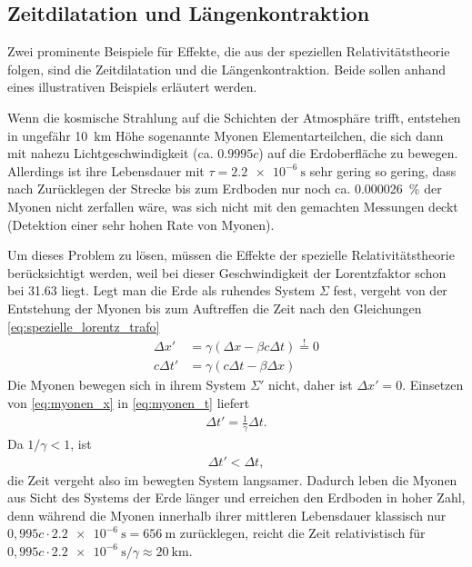 \subsection{Zeitdilatation und Längenkontraktion}

Zwei prominente Beispiele für Effekte, die aus der speziellen Relativitätstheorie folgen, sind die Zeitdilatation und die Längenkontraktion.
Beide sollen anhand eines illustrativen Beispiels erläutert werden.

Wenn die kosmische Strahlung auf die Schichten der Atmosphäre trifft, entstehen in ungefähr \SI{10}{\km} Höhe sogenannte Myonen \textendash{} Elementarteilchen, die sich dann mit nahezu Lichtgeschwindigkeit (ca. $\num{0,9995}c$) auf die Erdoberfläche zu bewegen.
Allerdings ist ihre Lebensdauer mit $\tau=\SI{2,2e-6}{\s}$ sehr gering \textendash{} so gering, dass nach Zurücklegen der Strecke bis zum Erdboden nur noch ca. \SI{0,000026}{\percent} der Myonen nicht zerfallen wäre, was sich nicht mit den gemachten Messungen deckt (Detektion einer sehr hohen Rate von Myonen).

Um dieses Problem zu lösen, müssen die Effekte der spezielle Relativitätstheorie berücksichtigt werden, weil bei dieser Geschwindigkeit der Lorentzfaktor schon bei \num{31,63} liegt.
Legt man die Erde als ruhendes System $\Sigma$ fest, vergeht von der Entstehung der Myonen bis zum Auftreffen die Zeit nach den Gleichungen \eqref{eq:spezielle_lorentz_trafo}
\begin{align}
    \label{eq:myonen_x}
    \Delta x'  & = \gamma(\Delta x-\beta c\Delta t) \overset{!}{=} 0 \\
    \label{eq:myonen_t}
    c\Delta t' & = \gamma(c \Delta t-\beta \Delta x)
\end{align}
Die Myonen bewegen sich in ihrem System $\Sigma'$ nicht, daher ist $\Delta x'= 0$.
Einsetzen von \eqref{eq:myonen_x} in \eqref{eq:myonen_t} liefert
\begin{align}
    \label{eq:zeitdilatation}
    \Delta t' = \frac{1}{\gamma}\Delta t.
\end{align}
Da $1/\gamma < 1$, ist
\begin{align*}
    \Delta t' < \Delta t,
\end{align*}
die Zeit vergeht also im bewegten System langsamer.
Dadurch leben die Myonen aus Sicht des Systems der Erde länger und erreichen den Erdboden in hoher Zahl,
denn während die Myonen innerhalb ihrer mittleren Lebensdauer klassisch nur $0,995c\cdot\SI{2,2e-6}{\s}=\SI{656}{\m}$ zurücklegen,
reicht die Zeit relativistisch für $0,995c\cdot\SI{2,2e-6}{\s}/\gamma\approx\SI{20}{\km}$.


